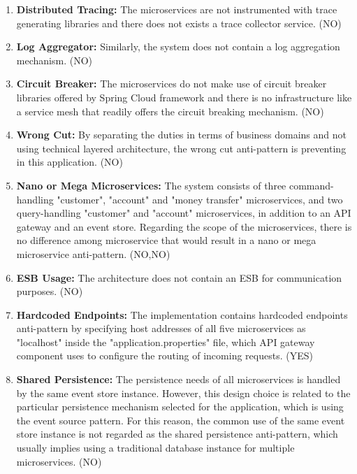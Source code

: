 \documentclass{Configuration_Files/PoliMi3i_thesis}
\begin{document}
\begin{enumerate}
    \item \textbf{Distributed Tracing:} The microservices are not instrumented with trace generating libraries and there does not exists a trace collector service. (NO)
    
    \item \textbf{Log Aggregator:} Similarly, the system does not contain a log aggregation mechanism. (NO)
    
    \item \textbf{Circuit Breaker:} The microservices do not make use of circuit breaker libraries offered by Spring Cloud framework and there is no infrastructure like a service mesh that readily offers the circuit breaking mechanism. (NO)
    
    \item \textbf{Wrong Cut:} By separating the duties in terms of business domains and not using technical layered architecture, the wrong cut anti-pattern is preventing in this application. (NO)
    
    \item \textbf{Nano or Mega Microservices:} The system consists of three command-handling "customer", "account" and "money transfer" microservices,  and two query-handling "customer" and "account" microservices, in addition to an API gateway and an event store.
    Regarding the scope of the microservices, there is no difference among microservice that would result in a nano or mega microservice anti-pattern. (NO,NO)
    
    \item \textbf{ESB Usage:} The architecture does not contain an ESB for communication purposes. (NO)
    
    \item \textbf{Hardcoded Endpoints:} The implementation contains hardcoded endpoints anti-pattern by specifying host addresses of all five microservices as "localhost" inside the "application.properties" file, which API gateway component uses to configure the routing of incoming requests. (YES)
    
    \item \textbf{Shared Persistence:} The persistence needs of all microservices is handled by the same event store instance.
    However, this design choice is related to the particular persistence mechanism selected for the application, which is using the event source pattern.
    For this reason, the common use of the same event store instance is not regarded as the shared persistence anti-pattern, which usually implies using a traditional database instance for multiple microservices. (NO)
    

\end{enumerate}
\end{document}
